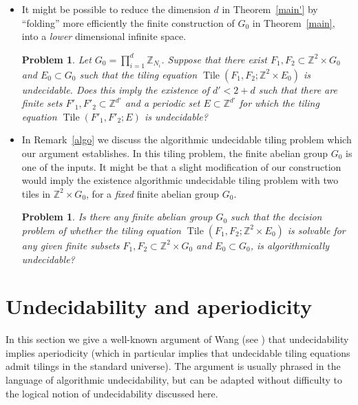 \documentclass[reqno,a4paper,12pt]{amsart}
\numberwithin{equation}{section}
\numberwithin{figure}{section}
\def\Z{\mathbb{Z}}
\newcommand{\Tile}{\operatorname{Tile}}
\theoremstyle{plain}
\newtheorem{problem}[thm]{Problem}
\theoremstyle{definition}
\newcommand{\thmref}[1]{Theorem~\ref{#1}}
\newcommand{\remref}[1]{Remark~\ref{#1}}
\begin{document}
\begin{itemize}
\item It might be possible  to reduce the dimension $d$ in \thmref{main'} by  ``folding'' more efficiently the finite construction of $G_0$ in \thmref{main}, into a \emph{lower} dimensional infinite space.
\begin{problem}
Let $G_0=\prod_{i=1}^{d} \Z_{N_i}$. Suppose that there exist $F_1,F_2\subset \Z^2\times G_0$ and $E_0\subset G_0$  such that the tiling equation $\Tile(F_1,F_2;\Z^2\times E_0)$ is  undecidable. Does this imply the existence of $d'<2+d$ such that there are finite sets $F'_1, F'_2\subset \Z^{d'}$ and a periodic set $E\subset \Z^{d'}$ for which the tiling equation $\Tile(F'_1,F'_2;E)$ is undecidable?  
\end{problem}

\item In   \remref{algo} we discuss the algorithmic undecidable tiling problem which our argument establishes. In this tiling problem, the finite abelian group $G_0$ is one of the inputs.  It might be that a slight  modification of our construction would imply the existence algorithmic undecidable tiling problem with two tiles in $\Z^2\times G_0$, for a \textit{fixed} finite abelian group $G_0$.
\begin{problem}
Is there any finite abelian group $G_0$ such that the  decision problem of whether the tiling equation $\Tile(F_1,F_2;\Z^2\times E_0)$ is solvable for any given finite subsets $F_1,F_2\subset \Z^2\times G_0$ and $E_0\subset G_0$, is algorithmically undecidable?
\end{problem}
\end{itemize}










 



\appendix

\section{Undecidability and aperiodicity}\label{wang-app}

In this section we give a well-known argument of Wang  (see \cite{Ber, R}) that undecidability implies aperiodicity (which in particular implies that undecidable tiling equations admit tilings in the standard universe).  The argument is usually phrased in the language of algorithmic undecidability, but can be adapted without difficulty to the logical notion of undecidability discussed here.
\end{document}

